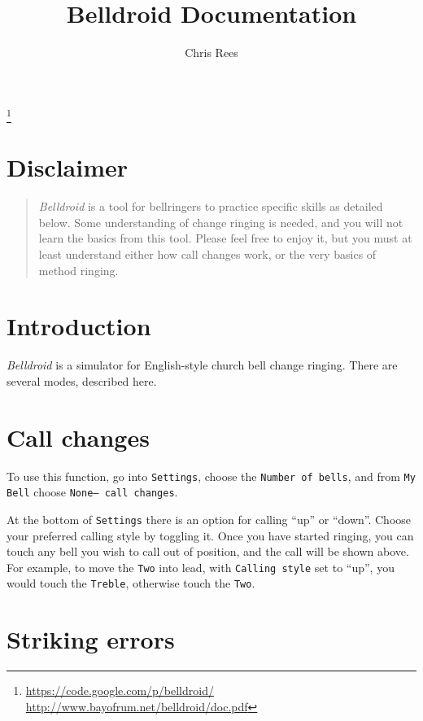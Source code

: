 \documentclass[11pt]{article} %
\title{Belldroid Documentation}
\author{Chris Rees}
\newcommand{\app}{\emph{Belldroid} }
\newcommand{\setting}{\texttt}
\begin{document}
\maketitle
\thanks{\href{https://code.google.com/p/belldroid/}{https://code.google.com/p/belldroid/} \\ \href{http://www.bayofrum.net/belldroid/doc.pdf}{http://www.bayofrum.net/belldroid/doc.pdf}}
\section*{Disclaimer}

\begin{quotation}
\app is a tool for bellringers to practice specific skills as detailed below.
Some understanding of change ringing is needed, and you will not learn the basics from this tool.
Please feel free to enjoy it, but you must at least understand either how call changes work, or the very basics of method ringing.
\end{quotation}

\section*{Introduction}

\app is a simulator for English-style church bell change ringing.  There are several modes, described here.

\tableofcontents

\newpage

\section{Call changes}

To use this function, go into \setting{Settings}, choose the \setting{Number of bells}, and from \setting{My Bell} choose \setting{None-- call changes}.

At the bottom of \setting{Settings} there is an option for calling ``up'' or ``down''.
Choose your preferred calling style by toggling it.
Once you have started ringing, you can touch any bell you wish to call out of position, and the call will be shown above.
For example, to move the \setting{Two} into lead, with \setting{Calling style} set to ``up'', you would touch the \setting{Treble}, otherwise touch the \setting{Two}.

\section{Striking errors}
\end{document}
